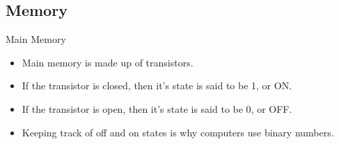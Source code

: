 \documentclass[graphics]{beamer}
\begin{document}
\subsection{Memory}
\begin{frame}{Main Memory}
 {
    \begin{itemize}
        \item Main memory is made up of transistors.
        \item If the transistor is closed, then it's state is said to be 1, or ON.
        \item If the transistor is open, then it's state is said to be 0, or OFF.
        \item Keeping track of off and on states is why computers use binary numbers.

\end{itemize}}
\end{frame}
\end{document}
